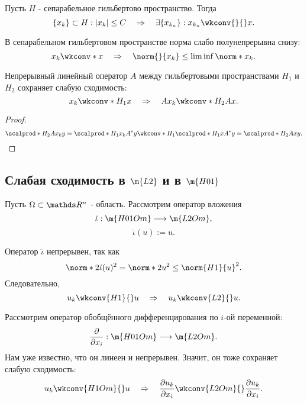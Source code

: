 \begin{note} Пусть $H$ - сепарабельное гильбертово пространство. Тогда
$$ \{ x_k \} \subset H : |x_k| \leq C \quad \Rightarrow \quad \exists \{ x_{k_n} \} : x_{k_n} \wkconv{}{} x.$$
\end{note}

\begin{note} В сепарабельном гильбертовом пространстве норма слабо полунепрерывна снизу:
$$x_k \wkconv*{}{} x \quad \Rightarrow \quad \norm{}{x_k} \leq \lim \inf \norm*{}{x_k}.$$
\end{note}


\begin{note} Непрерывный линейный оператор $A$ между гильбертовыми пространствами $H_1$ и $H_2$  сохраняет слабую сходимость:
$$ x_k \wkconv*{H_1}{} x \quad \Rightarrow \quad Ax_k \wkconv*{H_2}{} Ax.$$
\end{note}
\begin{proof}
$$ \scalprod*{H_2}{A x_k} {y} = \scalprod*{H_1}{x_k}{A^*y} \wkconv*{H_1}{} \scalprod*{H_1}{x}{A^*y} = \scalprod*{H_2}{Ax}{y}.$$

\end{proof}

\subsection{Слабая сходимость в $\m{L2}$ и в $\m{H01}$}
Пусть $\Omega \subset \real^n$ - область. Рассмотрим оператор вложения
$$\dot{\iota} : \m{H01Om} \longrightarrow \m{L2Om},$$
$$\dot{\iota}(u) := u.$$

Оператор $\dot{\iota}$ непрерывен, так как
$$ \norm*{2}{\dot{\iota}}(u)^2 = \norm*{2}{u}^2 \leq \norm{H1}{u}^2.$$
Следовательно,
$$ u_k \wkconv{H1}{} u \quad \Rightarrow \quad u_k \wkconv{L2}{} u.$$

Рассмотрим оператор обобщённого дифференцирования по $i$-ой переменной:
$$ \pder{x_i} : \m{H01Om} \longrightarrow \m{L2Om}.$$
Нам уже известно, что он линеен и непрерывен. Значит, он тоже сохраняет слабую сходимость:
$$ u_k \wkconv{H1Om}{} u \quad \Rightarrow \quad \pder[u_k]{x_i} \wkconv{L2Om}{} \pder[u_k]{x_i}.$$

